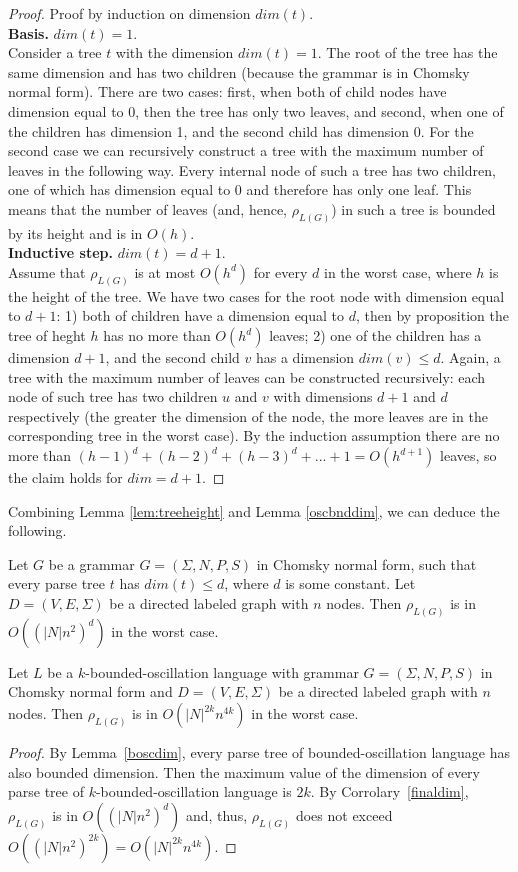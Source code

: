 \begin{proof}
Proof by induction on dimension $dim(t)$.
\\
\textbf{Basis.} $dim(t) = 1$.
\\
Consider a tree $t$ with the dimension $dim(t) = 1$. The root of the tree has the same dimension and has two children (because the grammar is in Chomsky normal form). There are two cases:  first, when both of child nodes have dimension equal to 0, then the tree has only two leaves, and second, when one of the children has dimension 1, and the second child has dimension 0. For the second case we can recursively construct a tree with the maximum number of leaves in the following way. Every internal node of such a tree has two children, one of which has dimension equal to 0 and therefore has only one leaf. This means that the number of leaves (and, hence, $\rho_{L(G)}$) in such a tree is bounded by its height and is in $O(h)$. 
\\
\textbf{Inductive step.} $dim(t) = d + 1$.
\\
Assume that $\rho_{L(G)}$ is at most $O(h^{d})$ for every $d$ in the worst case, where $h$ is the height of the tree. We have two cases for the root node with dimension equal to $d+1$: 1) both of children have a dimension equal to $d$, then by proposition the tree of heght $h$ has no more than $O(h^{d})$ leaves; 2) one of the children has a dimension $d + 1$, and the second child $v$ has a dimension $dim(v) \le d$. Again, a tree with the maximum number of leaves can be constructed recursively:  each node of such tree has two children $u$ and $v$ with dimensions $d+1$ and $d$ respectively (the greater the dimension of the node, the more leaves are in the corresponding tree in the worst case). By the induction assumption there are no more than $(h-1)^d + (h-2)^d + (h-3)^d + ... + 1 = O(h^{d+1})$ leaves, so the claim holds for $dim = d+1$.
\end{proof}
Combining Lemma \ref{lem:treeheight} and Lemma \ref{oscbnddim}, we can deduce the following.
\begin{corollary}
\label{finaldim}
Let $G$ be a grammar $G = (\Sigma, N, P, S)$ in Chomsky normal form, such that every parse tree $t$ has $dim(t) \le d$, where $d$ is some constant. Let $D=(V, E, \Sigma)$ be a directed labeled graph with $n$ nodes. Then $\rho_{L(G)}$ is in $O({(|N|n^2)}^d)$ in the worst case.
\end{corollary}
\begin{theorem}
\label{oscbndosc}
Let $L$ be a $k$-bounded-oscillation language with grammar $G = (\Sigma, N, P, S)$ in Chomsky normal form and $D=(V, E, \Sigma)$ be a directed labeled graph with $n$ nodes. Then $\rho_{L(G)}$ is in $O({|N|}^{2k}n^{4k})$ in the worst case.
\end{theorem}
\begin{proof}
By Lemma~\ref{boscdim}, every parse tree of bounded-oscillation language has also bounded dimension. Then the maximum value of the dimension of every parse tree of $k$-bounded-oscillation language is $2k$. By Corrolary~\ref{finaldim}, $\rho_{L(G)}$ is in $O({(|N|n^2)}^d)$ and, thus, $\rho_{L(G)}$ does not exceed $O({(|N|n^2)}^{2k}) = O({|N|}^{2k}n^{4k})$.
\end{proof}

